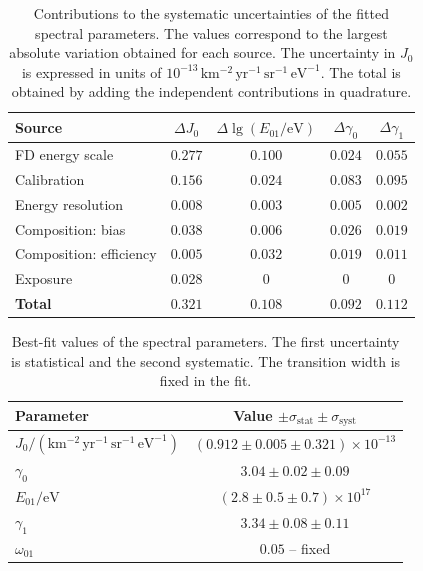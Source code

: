 \documentclass[main.tex]{subfiles}
\begin{document}
\begin{table}
    \centering
    \caption{
        Contributions to the systematic uncertainties of the fitted  spectral parameters.
        The values correspond to the largest absolute variation obtained for each source.
        The uncertainty in $J_0$ is expressed in units of
        $10^{-13}\,\mathrm{km^{-2}\,yr^{-1}\,sr^{-1}\,eV^{-1}}$.
        The total is obtained by adding the independent contributions in quadrature.
    }
    \label{table:sd433_parameter_systematics}
    \begin{tabular}{lcccc}
        \hline
        Source
        & $\Delta J_0$
        & $\Delta\lg(E_{01}/\mathrm{eV})$
        & $\Delta\gamma_0$
        & $\Delta\gamma_1$ \\
        \hline
        FD energy scale
        & $0.277$ & $0.100$ & $0.024$ & $0.055$ \\
        Calibration
        & $0.156$ & $0.024$ & $0.083$ & $0.095$ \\
        Energy resolution
        & $0.008$ & $0.003$ & $0.005$ & $0.002$ \\
        Composition: bias
        & $0.038$ & $0.006$ & $0.026$ & $0.019$ \\
        Composition: efficiency
        & $0.005$ & $0.032$ & $0.019$ & $0.011$ \\
        Exposure
        & $0.028$ & $0$ & $0$ & $0$ \\
        \hline
        \textbf{Total}
        & $\mathbf{0.321}$
        & $\mathbf{0.108}$
        & $\mathbf{0.092}$
        & $\mathbf{0.112}$ \\
        \hline
    \end{tabular}
\end{table}

\begin{table}
    \centering
    \caption{
        Best-fit values of the  spectral parameters.
        The first uncertainty is statistical and the second systematic.
        The transition width is fixed in the fit.
    }
    \label{table:sd433_spectral_parameters}
    \begin{tabular}{lc}
        \hline
        Parameter & Value $\pm\sigma_{\mathrm{stat}}\pm\sigma_{\mathrm{syst}}$ \\
        \hline
        $J_0/
        \left(
        \mathrm{km^{-2}\,yr^{-1}\,sr^{-1}\,eV^{-1}}
        \right)$
        & $(0.912\pm0.005\pm0.321)\times10^{-13}$ \\
        $\gamma_0$
        & $3.04\pm0.02\pm0.09$ \\
        $E_{01}/\mathrm{eV}$
        & $(2.8\pm0.5\pm0.7)\times10^{17}$ \\
        $\gamma_1$
        & $3.34\pm0.08\pm0.11$ \\
        $\omega_{01}$
        & $0.05$ -- fixed \\
        \hline
    \end{tabular}
\end{table}
\end{document}
